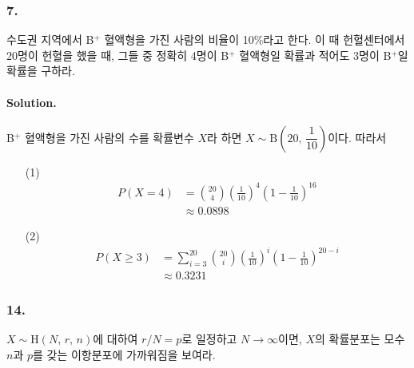 \subsubsection{7.} 수도권 지역에서 B$^+$ 혈액형을 가진 사람의 비율이 10\%라고 한다. 이 때 헌혈센터에서 20명이 헌혈을 했을 때, 그들 중 정확히 4명이 B$^+$ 혈액형일 확률과
적어도 3명이 B$^+$일 확률을 구하라.

\paragraph{Solution.} B$^+$ 혈액형을 가진 사람의 수를 확률변수 $X$라 하면 $X \sim \mathrm{B}\left(20,\,\dfrac{1}{10}\right)$이다. 따라서
\begin{itemize}
    \item[(1)] {
        \begin{align*}
            P\left(X=4\right) &= \binom{20}{4} \left(\frac{1}{10}\right)^4 \left(1-\frac{1}{10}\right)^{16}\\
            &\approx 0.0898
        \end{align*}
    }
    \item[(2)] {
        \begin{align*}
            P\left(X \geq 3\right) &= \sum_{i=3}^{20} \binom{20}{i} \left(\frac{1}{10}\right)^i \left(1-\frac{1}{10}\right)^{20-i}\\
            &\approx 0.3231
        \end{align*}
    }
\end{itemize}

\subsubsection{14.} $X \sim \mathrm{H}\left(N,\,r,\,n\right)$에 대하여 $r/N=p$로 일정하고 $N \rightarrow \infty$이면, $X$의 확률분포는 모수
$n$과 $p$를 갖는 이항분포에 가까워짐을 보여라.

